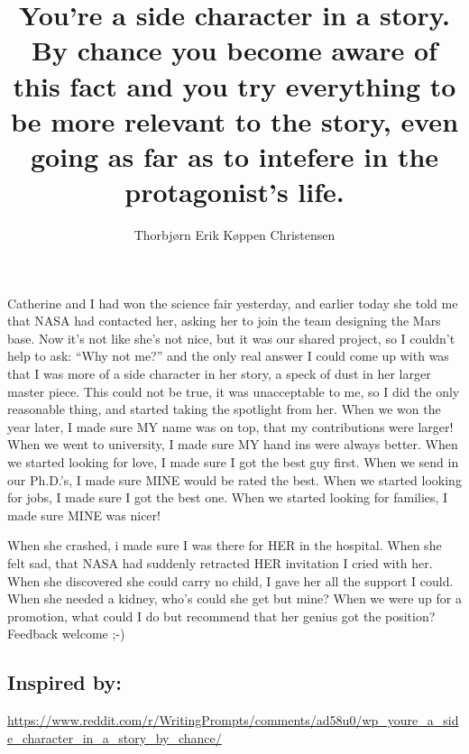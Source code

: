 \documentclass[oneside,danish,onecolumn,openbib,a4paper]{memoir}
\title{You're a side character in a story. By chance you become aware of this fact and you try everything to be more relevant to the story, even going as far as to intefere in the protagonist's life.}
\author{Thorbjørn Erik Køppen Christensen}
\begin{document}
\maketitle{}

Catherine and I had won the science fair yesterday, and earlier today she told me that NASA had contacted her, asking her to join the team designing the Mars base. 
Now it's not like she's not nice, but it was our shared project, so I couldn't help to ask: ``Why not me?''
and the only real answer I could come up with was that I was more of a side character in her story, a speck of dust in her larger master piece. 
This could not be true, it was unacceptable to me, so I did the only reasonable thing, and started taking the spotlight from her.
When we won the year later, I made sure MY name was on top, that my contributions were larger!\newline
When we went to university, I made sure MY hand ins were always better.\newline
When we started looking for love, I made sure I got the best guy first.\newline
When we send in our Ph.D.'s, I made sure MINE would be rated the best.\newline
When we started looking for jobs, I made sure I got the best one.\newline
When we started looking for families, I made sure MINE was nicer!

When she crashed, i made sure I was there for HER in the hospital.\newline
When she felt sad, that NASA had suddenly retracted HER invitation I cried with her.\newline
When she discovered she could carry no child, I gave her all the support I could.\newline
When she needed a kidney, who's could she get but mine?\newline
When we were up for a promotion, what could I do but recommend that her genius got the position?\newline
\newline\newline\newline
Feedback welcome ;-)

\subsection{Inspired by:}
\url{https://www.reddit.com/r/WritingPrompts/comments/ad58u0/wp_youre_a_side_character_in_a_story_by_chance/}
\end{document}
